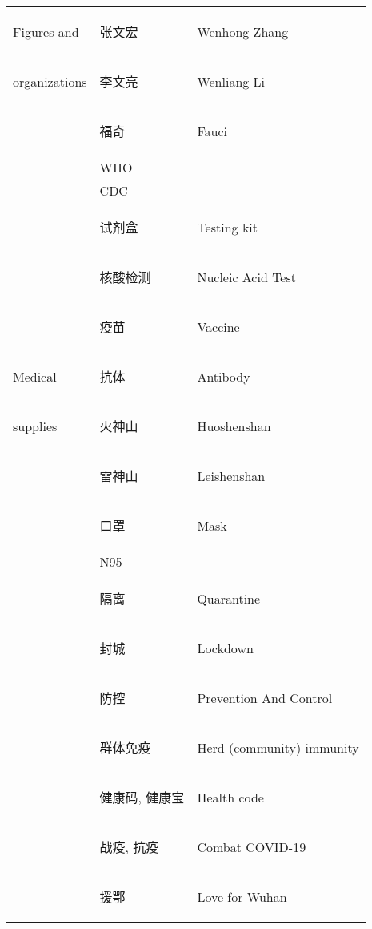 \documentclass [11pt, proquest] {uwthesis}[2020/02/24]
\begin{document}
\begin{longtable}{ p{3cm}p{5cm}p{8cm} }
Figures and&\begin{CJK*}{UTF8}{gbsn}张文宏\end{CJK*}&Wenhong Zhang\\
organizations&\begin{CJK*}{UTF8}{gbsn}李文亮\end{CJK*}&Wenliang Li\\
&\begin{CJK*}{UTF8}{gbsn}福奇\end{CJK*}&Fauci\\
&WHO&\\
&CDC&\\
 \hline
&\begin{CJK*}{UTF8}{gbsn}试剂盒\end{CJK*}&Testing kit\\
&\begin{CJK*}{UTF8}{gbsn}核酸检测\end{CJK*}&Nucleic Acid Test\\
&\begin{CJK*}{UTF8}{gbsn}疫苗\end{CJK*}&Vaccine\\
Medical&\begin{CJK*}{UTF8}{gbsn}抗体\end{CJK*}&Antibody\\
supplies&\begin{CJK*}{UTF8}{gbsn}火神山\end{CJK*}&Huoshenshan\\
&\begin{CJK*}{UTF8}{gbsn}雷神山\end{CJK*}&Leishenshan\\
&\begin{CJK*}{UTF8}{gbsn}口罩\end{CJK*}&Mask\\
&N95&\\
 \hline
&\begin{CJK*}{UTF8}{gbsn}隔离\end{CJK*}&Quarantine\\
&\begin{CJK*}{UTF8}{gbsn}封城\end{CJK*}&Lockdown\\
&\begin{CJK*}{UTF8}{gbsn}防控\end{CJK*}&Prevention And Control\\
&\begin{CJK*}{UTF8}{gbsn}群体免疫\end{CJK*}&Herd (community) immunity\\
&\begin{CJK*}{UTF8}{gbsn}健康码, 健康宝\end{CJK*}&Health code\\
&\begin{CJK*}{UTF8}{gbsn}战疫, 抗疫\end{CJK*}&Combat COVID-19\\
&\begin{CJK*}{UTF8}{gbsn}援鄂\end{CJK*}&Love for Wuhan\\
 \hline
\end{longtable}
\cite{Yang2020}
\end{document}
